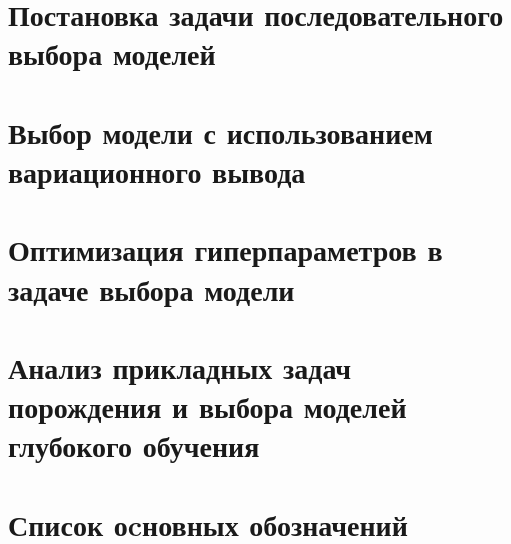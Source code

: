 \documentclass{dissert}
\theoremstyle{definition}
\begin{document}

\iffalse

\tableofcontents{}%

\clearpage
\fi
\chapter{Постановка задачи последовательного выбора моделей}


\clearpage
\chapter{Выбор модели с использованием вариационного вывода}


\clearpage


\chapter{Оптимизация гиперпараметров в задаче выбора модели}

\clearpage
\iffalse
\chapter{Выбор субоптимальной структуры модели}

\fi
\clearpage
\chapter{Анализ прикладных задач порождения и выбора моделей глубокого обучения}



\clearpage
{}



\clearpage


\chapter*{Список оcновных обозначений}

\clearpage 
 
\listoffigures

\clearpage
{}
\listoftables

\clearpage

\renewcommand{\bibname}{Список использованных источников}


\end{document}

